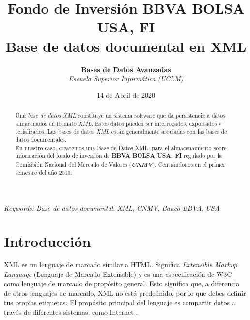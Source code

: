 \documentclass[11pt]{diazessay} %
\title{\textbf{Fondo de Inversión BBVA BOLSA USA, FI \\ Base de datos documental en XML}} %
\author{\textbf{Bases de Datos Avanzadas} \\ \textit{Escuela Superior Informática (UCLM)}} %
\date{14 de Abril de 2020} %
\begin{document}
\maketitle %




\begin{abstract}
	
	Una \textit{base de datos XML} constituye un sistema software que da persistencia a datos almacenados en formato \textit{XML}. Estos datos pueden ser interrogados, exportados y serializados. Las bases de datos \textit{XML} están generalmente asociadas con las bases de datos documentales.\\
	
	En nuestro caso, crearemos una Base de Datos XML, para el almacenamiento sobre información del fondo de inversión de \textbf{BBVA BOLSA USA, FI} regulado por la Comisisión Nacional del Mercado de Valores (\textbf{\textit{CNMV}}). Centrándonos en el primer semestre del año 2019.
\end{abstract}

\hspace*{3.6mm}\textit{Keywords:} \textit{Base de datos documental}, \textit{XML}, \textit{CNMV}, \textit{Banco BBVA}, \textit{USA}

\vspace{20pt} %

\newpage
\section*{Introducción}

XML \cite{xml} es un lenguaje de marcado similar a HTML. Significa \textit{Extensible Markup Language} (Lenguaje de Marcado Extensible) y es una especificación de W3C como lenguaje de marcado de propósito general. Esto significa que, a diferencia de otros lenguajes de marcado, XML no está predefinido, por lo que debes definir tus propias etiquetas. El propósito principal del lenguaje es compartir datos a través de diferentes sistemas, como Internet \cite{intro_xml}.\\
\end{document}
